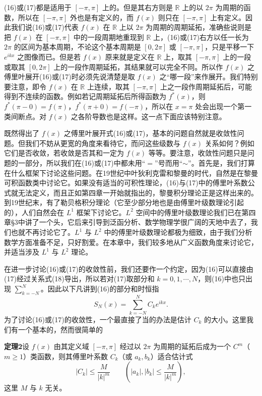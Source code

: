 (16)或(17)都是适用于 $[-\pi,\pi]$ 上的。但是其右方则是 $\mathbb R$ 上的以 $2\pi$ 为周期的函数，所以在 $[-\pi,\pi]$ 外也是有定义的，而 $f(x)$ 则只在 $[-\pi,\pi]$ 上有定义。因此我们说(16)或(17)代表 $f(x)$ 在 $\mathbb R$ 上以 $2\pi$ 为周期的周期延拓，准确些说则是把 $f(x)$ 在 $[-\pi,\pi]$ 中的一段周期地重现到 $\mathbb R$ 上，(16)或(17)右方以任一长为 $2\pi$ 的区间为基本周期，不论这个基本周期是 $[0,2\pi]$ 或 $[-\pi,\pi]$，只是平移一下 $e^{ikx}$ 之图像而已。但是若 $f(x)$ 原来就是定义在 $\mathbb R$ 上，取其 $[-\pi,\pi]$ 上的一段或取其 $[0,2\pi]$ 上的一段作周期延拓，其结果就可以完全不同。所以作 $f(x)$ 之傅里叶展开(16)或(17)时必须先说清楚是取 $f(x)$ 之“哪一段”来作展开。我们特别要注意，即令 $f(x)$ 在 $\mathbb R$ 上连续，取其 $[-\pi,\pi]$ 上之一段作周期延拓后，可能得到不连续的函数。例如若记周期延拓后所得函数为 $f^*(x)$，则 $f^*(\pi-0)=f(\pi)$，$f^*(\pi+0)=f(-\pi)$，所以在 $x=\pi$ 处会出现一个第一类间断点。对 $f(x)$ 之各阶导数也是这样。这一点下面应该特别注意。

既然得出了 $f(x)$ 之傅里叶展开式(16)或(17)，基本的问题自然就是收敛性问题。但我们不妨从更宽的角度来看待它，而问这些级数与 $f(x)$ 关系如何？例如它们是否收敛，若收敛是否其和一定为 $f(x)$ 等等。要注意，收敛性问题只是问题的一部分，所以我们在(16)或(17)中都未用“$=$”号而用“$\sim$”。首先是，我们打算在什么框架下讨论这些问题。在19世纪中叶狄利克雷和黎曼的时代，自然是在黎曼可积函数类中讨论它。如果没有适当的可积性理论，(16)与(17)中的傅里叶系数公式就无法定义，而且正如第四章一开始就指出的，黎曼积分理论正是这样出来的。到19世纪末，有了勒贝格积分理论（它至少部分地也是由傅里叶级数理论引起的），人们自然会在 $L^1$ 框架下讨论它。$L^2$ 空间中的傅里叶级数理论我们已在第四章\S3中讲了一个头，它后来引导到泛函分析、数学物理学很广阔的天地中去了，我们也就不再讨论它了。$L^1$ 与 $L^2$ 中的傅里叶级数理论都极为细致，由于我们分析数学方面准备不足，只好割爱。在本章中，我们较多地从广义函数角度来讨论它，并适当涉及 $L^1$ 与 $L^2$ 理论。

在进一步讨论(16)或(17)的收敛性前，我们还要作一个约定，因为(16)可以直接由(17)经过关系式(18)导出，所以若对(17)取部分和 $k=0,1,\cdots,N$，则(16)中也只出现 $\sum_{k=-N}^{N}$。因此以下凡讲到(16)的部分和时恒指
\begin{equation}
 S_N(x)=\sum_{k=-N}^{N}C_ke^{ikx}.
 \tag{19}
\end{equation}
为了讨论(16)或(17)的收敛性，一个最直接了当的办法是估计 $C_k$ 的大小。这里我们有一个基本的，然而很简单的

\noindent\textbf{定理2}\quad 设 $f(x)$ 由其定义域 $[-\pi,\pi]$ 经过以 $2\pi$ 为周期的延拓后成为一个 $C^m$（$m\ge1$）类函数，则其傅里叶系数 $C_k$（或 $a_k,b_k$）适合估计式
\begin{equation}
 |C_k|\le \frac{M}{|k|^m}
 \qquad
 \left(|a_k|,|b_k|\le\frac{M}{|k|^m}\right),
 \tag{20}
\end{equation}
这里 $M$ 与 $k$ 无关。

